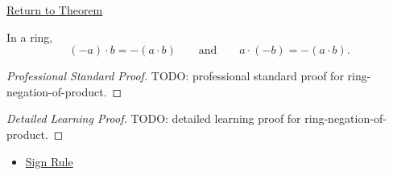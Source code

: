 \newpage
{}
\label{prf:ring-negation-of-product}

\begin{remark*}[Return]
\hyperref[thm:ring-negation-of-product]{Return to Theorem}
\end{remark*}

\begin{theorem*}
In a ring,
\[
(-a)\cdot b=-(a\cdot b)
\qquad\text{and}\qquad
a\cdot(-b)=-(a\cdot b).
\]
\end{theorem*}

\begin{proof}[Professional Standard Proof]
\LRAProofBodyStart
TODO: professional standard proof for ring-negation-of-product.
\end{proof}

\begin{proof}[Detailed Learning Proof]
\LRAProofBodyStart
TODO: detailed learning proof for ring-negation-of-product.
\end{proof}

\begin{remark*}
\end{remark*}

\begin{dependencies}
\begin{itemize}
  \item \hyperref[prop:sign-rule]{Sign Rule}
\end{itemize}
\end{dependencies}

\clearpage
